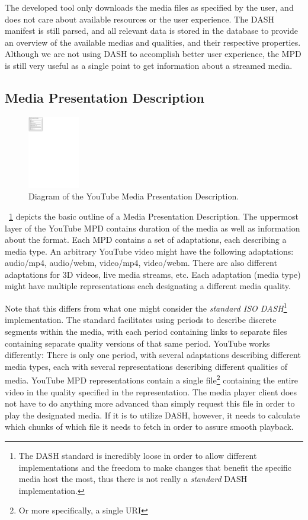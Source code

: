 The developed tool only downloads the media files as specified by the
user, and does not care about available resources or the user experience.
The DASH manifest is still parsed, and all relevant data is stored in the
database to provide an overview of the available medias and qualities,
and their respective properties. Although we are not using DASH to
accomplish better user experience, the MPD is still very useful as a
single point to get information about a streamed media.

\subsection{Media Presentation Description}

\begin{figure}
    \centering
    \includegraphics[width=0.2\textwidth]{figures/dash-mpd-diagram}
    \caption{Diagram of the YouTube Media Presentation Description.}
    \label{fig:dash-mpd-diagram}
\end{figure}

~\cref{fig:dash-mpd-diagram} depicts the basic outline of a Media Presentation
Description. The uppermost layer of the YouTube MPD contains duration of the
media as well as information about the format. Each MPD contains a set of
adaptations, each describing a media type. An arbitrary YouTube video might have
the following adaptations: audio/mp4, audio/webm, video/mp4, video/webm. There
are also different adaptations for 3D videos, live media streams, etc. Each
adaptation (media type) might have multiple representations each designating a
different media quality.

Note that this differs from what one might consider the \textit{standard ISO
DASH}\footnote{The DASH standard is incredibly loose in order to allow different
implementations and the freedom to make changes that benefit the specific media
host the most, thus there is not really a \textit{standard} DASH implementation.}
implementation. The standard facilitates using periods to
describe discrete segments within the media, with each period containing links
to separate files containing separate quality versions of that same period.
YouTube works differently: There is only one period, with several adaptations
describing different media types, each with several representations describing
different qualities of media. YouTube MPD representations contain a single file\footnote{Or more specifically, a single URI}
containing the entire video in the quality specified in the representation.
The media player client does not have to do anything more advanced than simply
request this file in order to play the designated media. If it is to utilize
DASH, however, it needs to calculate which chunks of which file it needs to
fetch in order to assure smooth playback.

